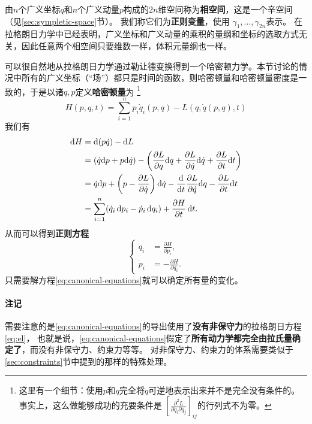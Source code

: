 \documentclass[UTF8, a4paper]{ctexart}
\newcommand*{\diff}{\mathop{}\!\mathrm{d}}
\begin{document}
由$n$个广义坐标$q$和$n$个广义动量$p$构成的$2n$维空间称为\textbf{相空间}，这是一个辛空间（见\ref{sec:sympletic-space}节）。
我们称它们为\textbf{正则变量}，使用
$\gamma_1, \ldots, \gamma_{2n}$表示。
在拉格朗日力学中已经表明，广义坐标和广义动量的乘积的量纲和坐标的选取方式无关，因此任意两个相空间只要维数一样，体积元量纲也一样。

可以很自然地从拉格朗日力学通过勒让德变换得到一个哈密顿力学。本节讨论的情况中所有的广义坐标（“场”）都只是时间的函数，则哈密顿量和哈密顿量密度是一致的，于是以诸$q,p$定义\textbf{哈密顿量}为
\footnote{这里有一个细节：使用$p$和$q$完全将$\dot{q}$可逆地表示出来并不是完全没有条件的。
事实上，这么做能够成功的充要条件是
$\left[ \frac{\partial^2 L}{ \partial \dot{q}_i \partial \dot{q}_j} \right]_{ij}$的行列式不为零。}
\begin{equation}
    H(p, q, t) = \sum_{i=1}^n p_i \dot{q}_i(p, q) - L(q, \dot{q}(p, q), t)
\end{equation}
我们有
\[
    \begin{aligned}
        \diff H &= \dd (p \dot{q}) - \dd L \\
        &= (\dot{q} \dd p + p \dd \dot{q}) 
        - \left( \pdv{L}{q} \dd q + \pdv{L}{\dot{q}} \dd \dot{q} + \pdv{L}{t} \dd t \right) \\
        &= \dot{q} \dd p + \left( p - \pdv{L}{\dot{q}} \right) \dd \dot{q} - \dv{t} \pdv{L}{\dot{q}} \dd q - \pdv{L}{t} \dd t \\
        &= \sum_{i=1}^n (\dot{q}_i \diff p_i - \dot{p}_i \diff q_i) + \frac{\partial H}{\partial t} \diff t.
    \end{aligned}
\]
从而可以得到\textbf{正则方程}
\begin{equation}
    \left\{
        \begin{aligned}
            \dot{q}_i &= \frac{\partial H}{\partial p_i}, \\
            \dot{p}_i &= - \frac{\partial H}{\partial q_i}.
        \end{aligned}
    \right.
    \label{eq:canonical-equations}
\end{equation}
只需要解方程\eqref{eq:canonical-equations}就可以确定所有量的变化。

\paragraph{注记} 需要注意的是\eqref{eq:canonical-equations}的导出使用了\textbf{没有非保守力}的拉格朗日方程\eqref{eq:el}，
也就是说，\eqref{eq:canonical-equations}假定了\textbf{所有动力学都完全由拉氏量确定了}，而没有非保守力、约束力等等。
对非保守力、约束力的体系需要类似于\ref{sec:constraints}节中提到的那样的特殊处理。
\end{document}

